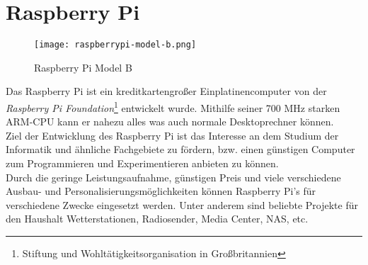 \chapter{Raspberry Pi}

				

\begin{figure}[h]
  \begin{center}		%
    \texttt{[image: raspberrypi-model-b.png]}
  		  \caption{Raspberry Pi Model B}
     \label{raspPic}
  \end{center}
\end{figure}			
				
Das Raspberry Pi ist ein kreditkartengroßer Einplatinencomputer von der \textit{Raspberry Pi Foundation}\footnote{Stiftung und Wohltätigkeitsorganisation in Großbritannien} entwickelt wurde. Mithilfe seiner 700 MHz starken ARM-CPU kann er nahezu alles was auch normale Desktoprechner können.\\

Ziel der Entwicklung des Raspberry Pi ist das Interesse an dem Studium der Informatik und ähnliche Fachgebiete zu fördern, bzw. einen günstigen Computer zum Programmieren und Experimentieren anbieten zu können.\\

Durch die geringe Leistungsaufnahme, günstigen Preis und viele verschiedene Ausbau- und Personalisierungsmöglichkeiten können Raspberry Pi’s für verschiedene Zwecke eingesetzt werden. Unter anderem sind beliebte Projekte für den Haushalt Wetterstationen, Radiosender, Media Center, NAS, etc.

\newpage

